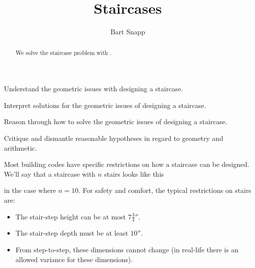 \documentclass[noauthor,nooutcomes,12pt]{ximera}
\title{Staircases}
\author{Bart Snapp}
\begin{document}
\begin{abstract}
  We solve the staircase problem with \snap.
\end{abstract}
\maketitle

\begin{listOutcomes}
\item{Understand the geometric issues with designing a staircase.}
\item{Interpret solutions for the geometric issues of designing a staircase.}
\item{Reason through how to solve the geometric issues of designing a staircase.}
\item{Critique and dismantle reasonable hypotheses in regard to geometry and arithmetic.}
\end{listOutcomes}



Most building codes have specific restrictions on how a staircase
can be designed. We'll say that a staircase with $n$ stairs looks like this
\begin{center}
\end{center}
in the case where $n=10$. For safety and comfort, the typical
restrictions on stairs are:
\begin{itemize}
\item The stair-step height can be at most $7\frac{3}{4}''$. 
\item The stair-step depth must be at least $10''$.
\item From step-to-step, these dimensions cannot change (in real-life there is
an allowed variance for these dimensions).
\end{itemize}
\end{document}
